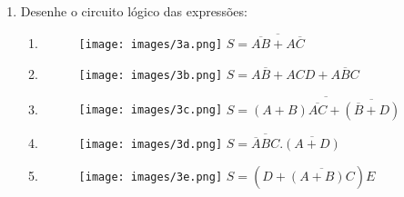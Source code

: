 \documentclass{article}[12pt]
\begin{document}
\begin{enumerate}
\pagebreak
    \item Desenhe o circuito lógico das expressões:
    \begin{enumerate}
        \item
            \begin{figure}[h!bt]
            \begin{center}
                \texttt{[image: images/3a.png]}
                \hspace{1cm}
                $S = \overline{\overline{AB} + A\overline{C}}$
            \end{center}
            \end{figure}
        \item
            \begin{figure}[h!bt]
            \begin{center}
                \texttt{[image: images/3b.png]}
                \hspace{1cm}
                $S = A\overline{B} + ACD + A\overline{B}C$
            \end{center}
            \end{figure}
        \item
            \begin{figure}[h!bt]
            \begin{center}
                \texttt{[image: images/3c.png]}
                \hspace{1cm}
                $S = \overline{(A+B)\overline{AC} + \overline{(\overline{B}+D)}}$
            \end{center}
            \end{figure}
        \item
            \begin{figure}[h!bt]
            \begin{center}
                \texttt{[image: images/3d.png]}
                \hspace{1cm}
                $S = \overline{\overline{A}BC}.\overline{(A+D)}$
            \end{center}
            \end{figure}
        \item
            \begin{figure}[h!bt]
            \begin{center}
                \texttt{[image: images/3e.png]}
                \hspace{1cm}
                $S = (D+\overline{(A+B)C})E$
            \end{center}
            \end{figure}
    \end{enumerate}
\end{enumerate}
\end{document}
